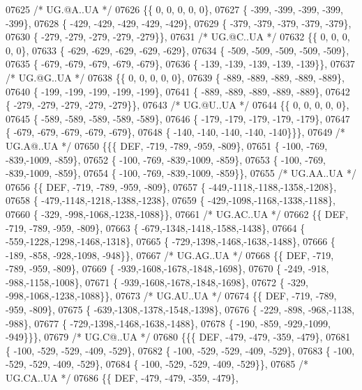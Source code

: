 \begin{DoxyCode}
07625 \textcolor{comment}{/* UG.@A..UA */}
07626 \{\{    0,    0,    0,    0,    0\},
07627 \{ -399, -399, -399, -399, -399\},
07628 \{ -429, -429, -429, -429, -429\},
07629 \{ -379, -379, -379, -379, -379\},
07630 \{ -279, -279, -279, -279, -279\}\},
07631 \textcolor{comment}{/* UG.@C..UA */}
07632 \{\{    0,    0,    0,    0,    0\},
07633 \{ -629, -629, -629, -629, -629\},
07634 \{ -509, -509, -509, -509, -509\},
07635 \{ -679, -679, -679, -679, -679\},
07636 \{ -139, -139, -139, -139, -139\}\},
07637 \textcolor{comment}{/* UG.@G..UA */}
07638 \{\{    0,    0,    0,    0,    0\},
07639 \{ -889, -889, -889, -889, -889\},
07640 \{ -199, -199, -199, -199, -199\},
07641 \{ -889, -889, -889, -889, -889\},
07642 \{ -279, -279, -279, -279, -279\}\},
07643 \textcolor{comment}{/* UG.@U..UA */}
07644 \{\{    0,    0,    0,    0,    0\},
07645 \{ -589, -589, -589, -589, -589\},
07646 \{ -179, -179, -179, -179, -179\},
07647 \{ -679, -679, -679, -679, -679\},
07648 \{ -140, -140, -140, -140, -140\}\}\},
07649 \textcolor{comment}{/* UG.A@..UA */}
07650 \{\{\{  DEF, -719, -789, -959, -809\},
07651 \{ -100, -769, -839,-1009, -859\},
07652 \{ -100, -769, -839,-1009, -859\},
07653 \{ -100, -769, -839,-1009, -859\},
07654 \{ -100, -769, -839,-1009, -859\}\},
07655 \textcolor{comment}{/* UG.AA..UA */}
07656 \{\{  DEF, -719, -789, -959, -809\},
07657 \{ -449,-1118,-1188,-1358,-1208\},
07658 \{ -479,-1148,-1218,-1388,-1238\},
07659 \{ -429,-1098,-1168,-1338,-1188\},
07660 \{ -329, -998,-1068,-1238,-1088\}\},
07661 \textcolor{comment}{/* UG.AC..UA */}
07662 \{\{  DEF, -719, -789, -959, -809\},
07663 \{ -679,-1348,-1418,-1588,-1438\},
07664 \{ -559,-1228,-1298,-1468,-1318\},
07665 \{ -729,-1398,-1468,-1638,-1488\},
07666 \{ -189, -858, -928,-1098, -948\}\},
07667 \textcolor{comment}{/* UG.AG..UA */}
07668 \{\{  DEF, -719, -789, -959, -809\},
07669 \{ -939,-1608,-1678,-1848,-1698\},
07670 \{ -249, -918, -988,-1158,-1008\},
07671 \{ -939,-1608,-1678,-1848,-1698\},
07672 \{ -329, -998,-1068,-1238,-1088\}\},
07673 \textcolor{comment}{/* UG.AU..UA */}
07674 \{\{  DEF, -719, -789, -959, -809\},
07675 \{ -639,-1308,-1378,-1548,-1398\},
07676 \{ -229, -898, -968,-1138, -988\},
07677 \{ -729,-1398,-1468,-1638,-1488\},
07678 \{ -190, -859, -929,-1099, -949\}\}\},
07679 \textcolor{comment}{/* UG.C@..UA */}
07680 \{\{\{  DEF, -479, -479, -359, -479\},
07681 \{ -100, -529, -529, -409, -529\},
07682 \{ -100, -529, -529, -409, -529\},
07683 \{ -100, -529, -529, -409, -529\},
07684 \{ -100, -529, -529, -409, -529\}\},
07685 \textcolor{comment}{/* UG.CA..UA */}
07686 \{\{  DEF, -479, -479, -359, -479\},

\end{DoxyCode}

